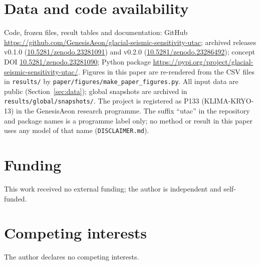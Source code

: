 \documentclass[11pt,a4paper]{article}
\begin{document}
\section*{Data and code availability}
Code, frozen files, result tables and documentation: GitHub \url{https://github.com/GenesisAeon/glacial-seismic-sensitivity-utac}; archived releases v0.1.0 (\href{https://doi.org/10.5281/zenodo.23281091}{10.5281/zenodo.23281091}) and v0.2.0 (\href{https://doi.org/10.5281/zenodo.23286492}{10.5281/zenodo.23286492}); concept DOI \href{https://doi.org/10.5281/zenodo.23281090}{10.5281/zenodo.23281090}; Python package \url{https://pypi.org/project/glacial-seismic-sensitivity-utac/}. Figures in this paper are re-rendered from the CSV files in \texttt{results/} by \texttt{paper/figures/make\_paper\_figures.py}. All input data are public (Section~\ref{sec:data}); global snapshots are archived in \texttt{results/global/snapshots/}. The project is registered as P133 (KLIMA-KRYO-13) in the GenesisAeon research programme. The suffix ``utac'' in the repository and package names is a programme label only; no method or result in this paper uses any model of that name (\texttt{DISCLAIMER.md}).

\section*{Funding}
This work received no external funding; the author is independent and self-funded.

\section*{Competing interests}
The author declares no competing interests.

\printbibliography[heading=bibintoc]
\end{document}

